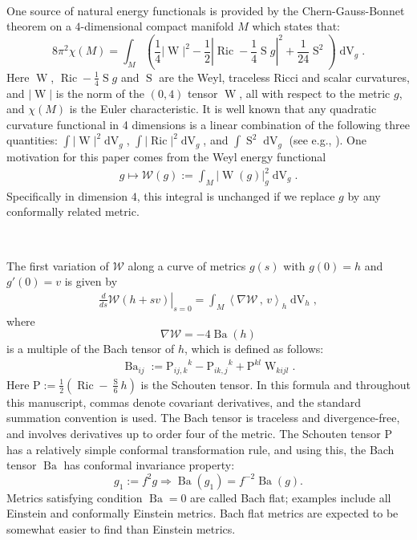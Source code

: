 \documentclass[10pt,reqno]{amsart}
\newcommand{\sW}{\mathcal{W}}
\DeclareMathOperator{\dvol}{dV}
\DeclareMathOperator{\Ric}{Ric}
\renewcommand{\P}{\mathrm{P}}
\DeclareMathOperator{\W}{W}
\DeclareMathOperator{\Ba}{Ba}
\DeclareMathOperator{\Scal}{S}
\newcommand{\inn}[2]{\left\langle #1 \, , \, #2 \right\rangle}
\begin{document}
\

One source of natural energy functionals is provided by the Chern-Gauss-Bonnet theorem on a $4$-dimensional compact manifold $M$ \cite{Besse} which states that: 
\begin{equation*}
8 \pi^2 \chi(M) = \int_{M} \left(\frac{1}{4} |\W|^2 - \frac{1}{2} \left|\Ric - \frac{1}{4} \Scal g\right|^2 + \frac{1}{24} \Scal ^2 \right)\dvol_g.
\end{equation*}
Here $\W$, $\Ric - \frac{1}{4} \Scal g$ and $\Scal$ are the Weyl, traceless Ricci and scalar curvatures, and $|\W|$ is the norm of the $(0,4)$
tensor $\W$, all with respect to the metric $g$, and $\chi(M)$ is the Euler characteristic. It is well known that any quadratic curvature functional in 4 dimensions is a linear combination of the following three quantities:  $\int |\W|^2 \dvol_g $, $\int |\Ric|^2\dvol_g $, and  $\int \Scal^2\dvol_g $ 
(see e.g., \cite{Besse, GV}). One motivation for this paper comes from  the Weyl energy functional
\begin{align*}
g \longmapsto \sW(g) := \int_{M} | \W(g) |^2_g \dvol_g.
\end{align*}
Specifically in dimension $4$, this integral is unchanged if we replace $g$ by any conformally related metric.

\

The first variation of $\sW$ along a curve of metrics $g(s)$ with $g(0) = h$ and $g'(0) = v$ is given by
\begin{align*}
\left. \frac{d}{ds}  \sW( h + sv ) \right|_{s=0} = \int_{M} \inn{\nabla \sW}{ v}_h \dvol_h, 
\end{align*}
where 
\[ 
\nabla \sW = -4 \Ba(h)
\]
is a multiple of the Bach tensor of $h$, which is defined as follows: 
\begin{align} \label{eqn:def-bach}
\Ba_{ij} := {\P_{ij,k}}^k - {\P_{ik,j}}^k + \P^{kl} \W_{kijl}.
\end{align}
Here $\P:= \frac{1}{2} \left( \Ric - \frac{\Scal}{6} h\right)$ is the Schouten tensor. In this formula and throughout this manuscript, commas denote covariant 
derivatives, and the standard summation convention is used. The Bach tensor is traceless and divergence-free, and involves derivatives up to order four of 
the metric. The Schouten tensor $\P$ has a relatively simple conformal transformation rule,
and using this, the Bach tensor $\Ba$ has conformal invariance property:  
\[
g_1 := f^2 g \Longrightarrow \Ba(g_1) = f^{-2} \Ba(g).
\]
Metrics satisfying condition $\Ba = 0$ are called Bach flat; examples include all Einstein and conformally Einstein metrics. Bach flat 
metrics are expected to be somewhat easier to find than Einstein metrics. 
\end{document}
